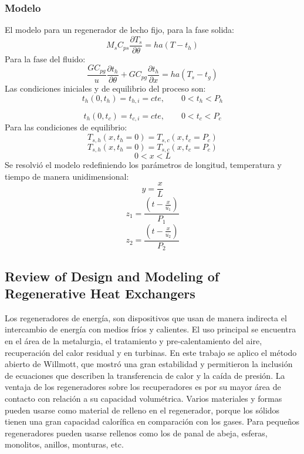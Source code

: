 \documentclass[12pt,letterpaper,final]{article}%
\begin{document}
\subsubsection*{Modelo}
El modelo para un regenerador de lecho fijo, para la fase solida:
\begin{equation}
	M_s C_{ps}\frac{\partial T_s}{\partial \theta} = h a (T - t_h)
\end{equation}
Para la fase del fluido:
\begin{equation}
	\frac{G C_{pg}}{u}\frac{\partial t_h}{\partial \theta} + G C_{pg}\frac{\partial t_h}{\partial x} = ha(T_s - t_g)
\end{equation}
Las condiciones iniciales y de equilibrio del proceso son:
\begin{equation*}
	t_h(0,t_h) = t_{h,i} = cte , \qquad 0<t_h<P_h
\end{equation*}

\begin{equation*}
	t_h(0,t_c) = t_{c,i} = cte , \qquad 0<t_c<P_c
\end{equation*}
Para las condiciones de equilibrio:
\begin{equation*}
	T_{s,h}(x,t_h=0) = T_{s,c}(x,t_c=P_c)
\end{equation*}
\begin{equation*}
	T_{s,h}(x,t_h=0) = T_{s,c}(x,t_c=P_c)
\end{equation*}
\begin{equation*}
	0<x<L
\end{equation*}
Se resolvió el modelo redefiniendo los parámetros de longitud, temperatura y tiempo de manera unidimensional:
\begin{equation*}
	y = \frac{x}{L}
\end{equation*}
\begin{equation*}
	z_1 = \frac{(t-\frac{x}{u_1})}{P_1}
\end{equation*}
\begin{equation*}
	z_2 = \frac{(t-\frac{x}{u_2})}{P_2}
\end{equation*}
\subsection*{Review of Design and Modeling of Regenerative
	Heat Exchangers}
	Los regeneradores de energía, son dispositivos que usan de manera indirecta el intercambio de energía con medios fríos y calientes. El uso principal se encuentra en el área de la metalurgia, el tratamiento y pre-calentamiento del aire, recuperación del calor residual y en turbinas. En este trabajo se aplico el método abierto de Willmott, que mostró una gran estabilidad y permitieron la inclusión de ecuaciones que describen la transferencia de calor y la caída de presión. La ventaja de los regeneradores sobre los recuperadores es por su mayor área de contacto con relación a su capacidad volumétrica. Varios materiales y formas pueden usarse como material de relleno en el regenerador, porque los sólidos tienen una gran capacidad calorífica en comparación con los gases. Para pequeños regeneradores pueden usarse rellenos como los de panal de abeja, esferas, monolitos, anillos, monturas, etc.  \cite{Kilkovsky2020}
\end{document}
